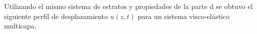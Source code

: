 Utilizando el mismo sistema de estratos y propiedades de la parte d se obtuvo el siguiente perfil de desplazamiento $u(z,t)$ para un sistema visco-elástico multicapa.


